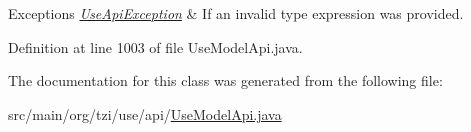 \begin{DoxyExceptions}{Exceptions}
{\em \hyperlink{classorg_1_1tzi_1_1use_1_1api_1_1_use_api_exception}{Use\-Api\-Exception}} & If an invalid type expression was provided. \\
\hline
\end{DoxyExceptions}


Definition at line 1003 of file Use\-Model\-Api.\-java.



The documentation for this class was generated from the following file\-:\begin{DoxyCompactItemize}
\item 
src/main/org/tzi/use/api/\hyperlink{_use_model_api_8java}{Use\-Model\-Api.\-java}\end{DoxyCompactItemize}
